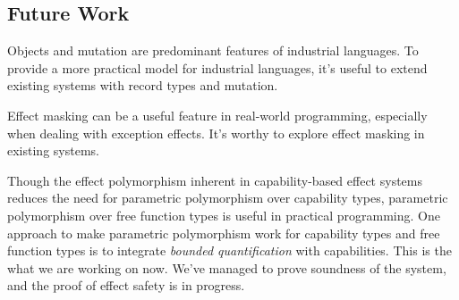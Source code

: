 \subsection{Future Work}

Objects and mutation are predominant features of industrial
languages. To provide a more practical model for industrial languages,
it's useful to extend existing systems with record types and mutation.

Effect masking can be a useful feature in real-world programming,
especially when dealing with exception effects. It's worthy to explore
effect masking in existing systems.

Though the effect polymorphism inherent in capability-based effect
systems reduces the need for parametric polymorphism over capability
types, parametric polymorphism over free function types is useful in
practical programming.  One approach to make parametric polymorphism
work for capability types and free function types is to integrate
\emph{bounded quantification} with capabilities. This is the what we
are working on now. We've managed to prove soundness of the system,
and the proof of effect safety is in progress.


